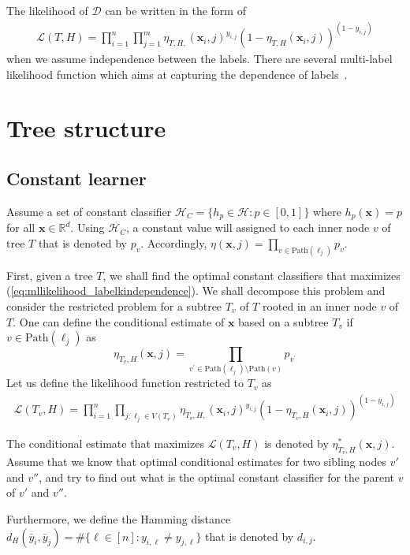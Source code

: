 \documentclass{article}
\newcommand{\R}{\mathbb{R}}
\newcommand{\cD}{\mathcal{D}}
\newcommand{\cH}{\mathcal{H}}
\newcommand{\cL}{\mathcal{L}}
\newcommand{\path}{\text{Path}}
\newcommand{\bx}{\mathbf{x}}
\begin{document}
The likelihood of $\cD$ can be written in the form of
\begin{align}
\cL ( T, H ) = \prod_{i=1}^{n} \prod_{j=1}^m \eta_{T,H,} ( \bx_i , j )^{y_{i,j}} (1-\eta_{T,H} ( \bx_i , j ))^{(1-y_{i,j})}
\label{eq:mllikelihood_labelkindependence}
\end{align}
when we assume independence between the labels. There are several multi-label likelihood function which aims at capturing the dependence of labels~\citep{ZhangS12}. 


\section{Tree structure}

\subsection{Constant learner}


Assume a set of constant classifier $\cH_{C} = \{h_p\in \cH : p\in [0,1] \}$ where $h_p(\bx) = p$ for all $\bx \in \R^d$. Using $\cH_{C}$, a constant value will assigned to each inner node $v$ of tree $T$ that is denoted by $p_v$. Accordingly, $\eta( \bx, j ) = \prod_{v \in \path(\ell_j)} p_v$. 

First, given a tree $T$, we shall find the optimal constant classifiers that maximizes (\ref{eq:mllikelihood_labelkindependence}). We shall decompose this problem and consider the restricted problem for a subtree $T_v$ of $T$ rooted in an inner node $v$ of $T$. One can define the conditional estimate of $\bx$ based on a subtree $T_v$ if $v\in \path (\ell_j)$ as 
\[
\eta_{T_v, H} (\bx , j) = \prod_{v^{\prime} \in \path(\ell_j) \setminus \path(v)}  p_{v^{\prime}}
\]
Let us define the likelihood function restricted to $T_v$ as
\begin{align}
\cL ( T_v, H ) = \prod_{i=1}^{n} \prod_{j : \ell_j \in V(T_v) } \eta_{T_v,H,} ( \bx_i , j )^{y_{i,j}} (1-\eta_{T_v,H} ( \bx_i , j ))^{(1-y_{i,j})}
\label{eq:mllikelihood_restricted}
\end{align}

The conditional estimate that maximizes $\cL ( T_v, H )$ is denoted by $\eta_{T_v, H}^* (\bx , j)$. Assume that we know that optimal conditional estimates for two sibling nodes $v'$ and $v''$, and try to find out what is the optimal constant classifier for the parent $v$ of $v'$ and $v''$.

Furthermore, we define the Hamming distance $d_H( \bar{y}_i, \bar{y}_j) = \# \{ \ell \in [n] : y_{i,\ell} \neq y_{j,\ell} \}$ that is denoted by $d_{i,j}$.
\end{document}
